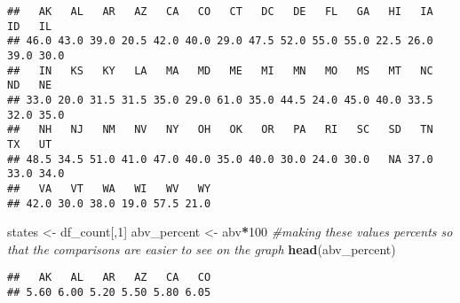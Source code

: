 \documentclass[]{article}
\newenvironment{Shaded}{\begin{snugshade}}{\end{snugshade}}
\newcommand{\CommentTok}[1]{\textcolor[rgb]{0.56,0.35,0.01}{\textit{#1}}}
\newcommand{\DataTypeTok}[1]{\textcolor[rgb]{0.13,0.29,0.53}{#1}}
\newcommand{\DecValTok}[1]{\textcolor[rgb]{0.00,0.00,0.81}{#1}}
\newcommand{\KeywordTok}[1]{\textcolor[rgb]{0.13,0.29,0.53}{\textbf{#1}}}
\newcommand{\NormalTok}[1]{#1}
\newcommand{\OperatorTok}[1]{\textcolor[rgb]{0.81,0.36,0.00}{\textbf{#1}}}
\newcommand{\OtherTok}[1]{\textcolor[rgb]{0.56,0.35,0.01}{#1}}
\newcommand{\StringTok}[1]{\textcolor[rgb]{0.31,0.60,0.02}{#1}}
\begin{document}
\begin{Shaded}
\end{Shaded}

\begin{verbatim}
##   AK   AL   AR   AZ   CA   CO   CT   DC   DE   FL   GA   HI   IA   ID   IL 
## 46.0 43.0 39.0 20.5 42.0 40.0 29.0 47.5 52.0 55.0 55.0 22.5 26.0 39.0 30.0 
##   IN   KS   KY   LA   MA   MD   ME   MI   MN   MO   MS   MT   NC   ND   NE 
## 33.0 20.0 31.5 31.5 35.0 29.0 61.0 35.0 44.5 24.0 45.0 40.0 33.5 32.0 35.0 
##   NH   NJ   NM   NV   NY   OH   OK   OR   PA   RI   SC   SD   TN   TX   UT 
## 48.5 34.5 51.0 41.0 47.0 40.0 35.0 40.0 30.0 24.0 30.0   NA 37.0 33.0 34.0 
##   VA   VT   WA   WI   WV   WY 
## 42.0 30.0 38.0 19.0 57.5 21.0
\end{verbatim}

\begin{Shaded}
\begin{Highlighting}[]
\NormalTok{states <-}\StringTok{ }\NormalTok{df_count[,}\DecValTok{1}\NormalTok{]}
\NormalTok{abv_percent <-}\StringTok{ }\NormalTok{abv}\OperatorTok{*}\DecValTok{100} \CommentTok{#making these values percents so that the comparisons are easier to see on the graph}
\KeywordTok{head}\NormalTok{(abv_percent)}
\end{Highlighting}
\end{Shaded}

\begin{verbatim}
##   AK   AL   AR   AZ   CA   CO 
## 5.60 6.00 5.20 5.50 5.80 6.05
\end{verbatim}

\begin{Shaded}
\end{Shaded}
\end{document}
